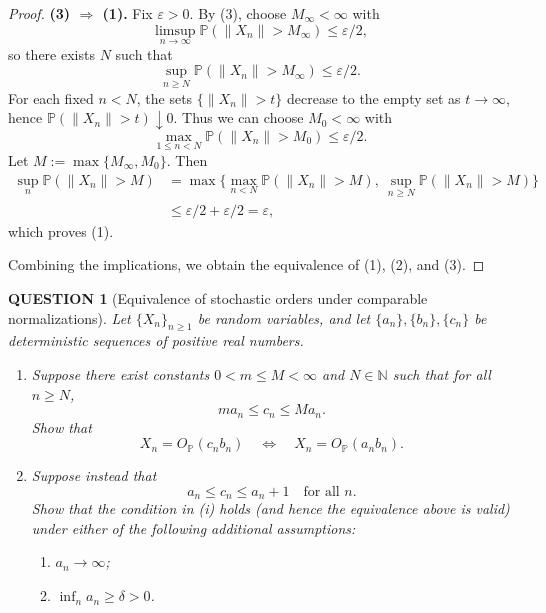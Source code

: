 \documentclass[12pt]{article}
\renewcommand{\(}{\left(}%
\renewcommand{\)}{\right)}%
\renewcommand{\[}{\left[}%
\renewcommand{\]}{\right]}%
\newtheorem{question}{QUESTION}[section]}
\newtheorem{proof}{Proof.}}
\begin{document}
\begin{proof}
\smallskip
\textbf{(3) $\Rightarrow$ (1).}
Fix $\varepsilon>0$. By (3), choose $M_\infty<\infty$ with
\begin{equation*}
\limsup_{n\to\infty}\mathbb{P}(\|X_n\|>M_\infty)\le \varepsilon/2,
\end{equation*}
so there exists $N$ such that
\begin{equation*}
\sup_{n\ge N}\mathbb{P}(\|X_n\|>M_\infty)\le \varepsilon/2.
\end{equation*}
For each fixed $n<N$, the sets $\{\|X_n\|>t\}$ decrease to the empty set as $t\to\infty$, hence $\mathbb{P}(\|X_n\|>t)\downarrow 0$. Thus we can choose $M_0<\infty$ with
\begin{equation*}
\max_{1\le n<N}\mathbb{P}(\|X_n\|>M_0)\le \varepsilon/2.
\end{equation*}
Let $M:=\max\{M_\infty,M_0\}$. Then
\begin{equation*}
\begin{split}
	\sup_{n}\mathbb{P}(\|X_n\|>M)
&=\max\Big\{\max_{n<N}\mathbb{P}(\|X_n\|>M),\ \sup_{n\ge N}\mathbb{P}(\|X_n\|>M)\Big\}\\
&\le \varepsilon/2+\varepsilon/2=\varepsilon,
\end{split}
\end{equation*}
which proves (1).

\smallskip
Combining the implications, we obtain the equivalence of (1), (2), and (3).
\end{proof}

\begin{question}[Equivalence of stochastic orders under comparable normalizations]
Let $\{X_n\}_{n\ge1}$ be random variables, and let $\{a_n\},\{b_n\},\{c_n\}$ be deterministic sequences of positive real numbers. 

\begin{enumerate}
\item[(i)] Suppose there exist constants $0<m\le M<\infty$ and $N\in\mathbb{N}$ such that for all $n\ge N$,
\begin{equation*}
m a_n \le c_n \le M a_n.
\end{equation*}
Show that
\begin{equation*}
X_n = O_{\mathbb{P}}(c_n b_n)
\quad \Longleftrightarrow \quad
X_n = O_{\mathbb{P}}(a_n b_n).
\end{equation*}

\item[(ii)] Suppose instead that
\begin{equation*}
a_n \le c_n \le a_n + 1 \quad \text{for all } n.
\end{equation*}
Show that the condition in (i) holds (and hence the equivalence above is valid) under either of the following additional assumptions:
\begin{enumerate}
\item[(a)] $a_n \to \infty$;
\item[(b)] $\inf_n a_n \ge \delta > 0$.
\end{enumerate}
\end{enumerate}
\end{question}
\end{document}
